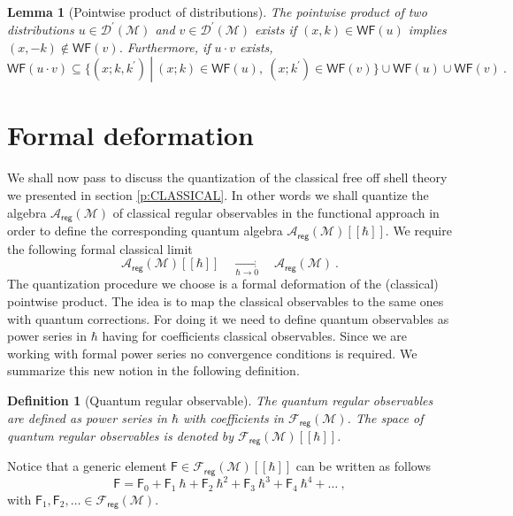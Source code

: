 \documentclass[11pt]{book}
\newcommand{\WF}{\mathsf{WF}}
\newcommand{\reg}{\mathsf{reg}}
\newcommand{\Acal}{\mathcal{A}}
\newcommand{\Dcal}{\mathcal{D}}
\newcommand{\Fcal}{\mathcal{F}}
\newcommand{\Mcal}{\mathcal{M}}
\newcommand{\Fsf}{\mathsf{F}}
\theoremstyle{break}
\newtheorem{lemma}{Lemma}[chapter]
\newtheorem{definition}{Definition}[chapter]
\begin{document}
\begin{lemma}[Pointwise product of distributions]\label{lem:prod_distrib_wf}
The pointwise product of two distributions $u\in\Dcal^\prime(\Mcal)$ and $v\in\Dcal^\prime(\Mcal)$ exists if $(x,k) \in \WF(u)$ implies $(x,-k) \notin \WF(v)$. Furthermore, if $u\cdot v$ exists, 
\begin{equation*}
\WF(u \cdot v) \subseteq \bigg\{ (x;k,k^\prime) \ \left\vert \ (x;k) \in \WF(u) , \ (x;k^\prime) \in \WF(v) \bigg\} \right. \cup \WF(u) \cup \WF(v) \ . 
\end{equation*} 
%
\end{lemma}


\section{Formal deformation}
\label{p:Q_DEFORM}


We shall now pass to discuss the quantization of the classical free off shell theory we presented in section \ref{p:CLASSICAL}. In other words we shall quantize the algebra $\Acal_\reg(\Mcal)$ of classical regular observables in the functional approach in order to define the corresponding quantum algebra $\Acal_\reg(\Mcal)[[\hbar]]$. We require the following formal classical limit
%
\begin{equation*}
\Acal_\reg(\Mcal)[[\hbar]] \quad \underset{\hbar \to 0}{\longrightarrow} \quad \Acal_\reg(\Mcal) \ . 
\end{equation*}
%
The quantization procedure we choose is a formal deformation of the (classical) pointwise product. The idea is to map the classical observables to the same ones with quantum corrections. For doing it we need to define quantum observables as power series in $\hbar$ having for coefficients classical observables. Since we are working with formal power series no convergence conditions is required. We summarize this new notion in the following definition.


\begin{definition}[Quantum regular observable]\label{def:obs_reg_q}
The quantum regular observables are defined as power series in $\hbar$ with coefficients in $\Fcal_\reg(\Mcal)$. The space of quantum regular observables is denoted by $\Fcal_\reg(\Mcal)[[\hbar]]$.
\end{definition}

Notice that a generic element $\Fsf \in \Fcal_\reg(\Mcal)[[\hbar]]$ can be written as follows
%
\begin{equation*}
\Fsf = \Fsf_0 + \Fsf_1 \ \hbar + \Fsf_2 \ \hbar^2 + \Fsf_3 \ \hbar^3 + \Fsf_4 \ \hbar^4 + \dots \ ,
\end{equation*}
%
with $\Fsf_1, \Fsf_2, \dots \in \Fcal_\reg(\Mcal)$. 
\end{document}
